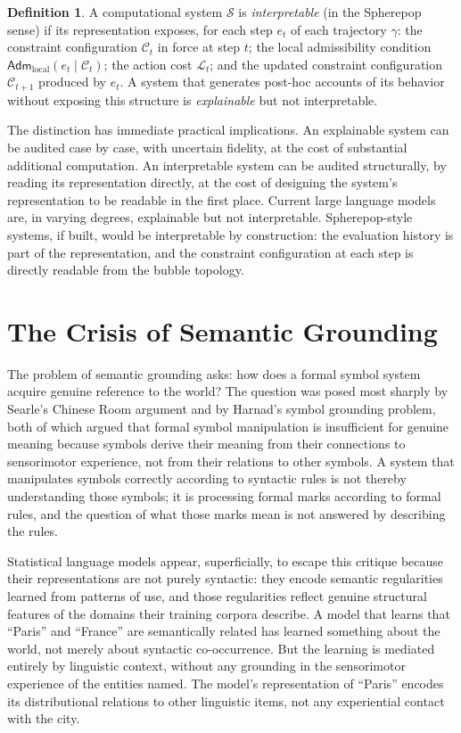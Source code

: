 \documentclass[12pt,openany]{book}
\theoremstyle{plain}
\theoremstyle{definition}
\newtheorem{definition}[theorem]{Definition}
\theoremstyle{remark}
\newcommand{\sadm}{\mathsf{Adm}}
\begin{document}
\begin{definition}
A computational system $\mathcal{S}$ is \emph{interpretable} (in the Spherepop sense) if its representation exposes, for each step $e_t$ of each trajectory $\gamma$: the constraint configuration $\mathcal{C}_t$ in force at step $t$; the local admissibility condition $\sadm_{\mathrm{local}}(e_t \mid \mathcal{C}_t)$; the action cost $\mathcal{L}_t$; and the updated constraint configuration $\mathcal{C}_{t+1}$ produced by $e_t$. A system that generates post-hoc accounts of its behavior without exposing this structure is \emph{explainable} but not interpretable.
\end{definition}

The distinction has immediate practical implications. An explainable system can be audited case by case, with uncertain fidelity, at the cost of substantial additional computation. An interpretable system can be audited structurally, by reading its representation directly, at the cost of designing the system's representation to be readable in the first place. Current large language models are, in varying degrees, explainable but not interpretable. Spherepop-style systems, if built, would be interpretable by construction: the evaluation history is part of the representation, and the constraint configuration at each step is directly readable from the bubble topology.

\section{The Crisis of Semantic Grounding}

The problem of semantic grounding asks: how does a formal symbol system acquire genuine reference to the world? The question was posed most sharply by Searle's Chinese Room argument and by Harnad's symbol grounding problem, both of which argued that formal symbol manipulation is insufficient for genuine meaning because symbols derive their meaning from their connections to sensorimotor experience, not from their relations to other symbols. A system that manipulates symbols correctly according to syntactic rules is not thereby understanding those symbols; it is processing formal marks according to formal rules, and the question of what those marks mean is not answered by describing the rules.

Statistical language models appear, superficially, to escape this critique because their representations are not purely syntactic: they encode semantic regularities learned from patterns of use, and those regularities reflect genuine structural features of the domains their training corpora describe. A model that learns that \enquote{Paris} and \enquote{France} are semantically related has learned something about the world, not merely about syntactic co-occurrence. But the learning is mediated entirely by linguistic context, without any grounding in the sensorimotor experience of the entities named. The model's representation of \enquote{Paris} encodes its distributional relations to other linguistic items, not any experiential contact with the city.
\end{document}
